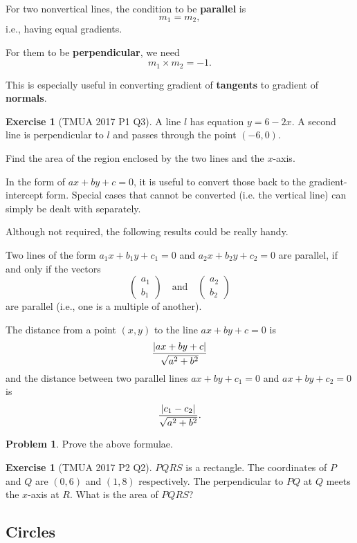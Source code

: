 \documentclass[11pt]{article}
\theoremstyle{definition}
\newtheorem{example}[theorem]{Exercise}
\newtheorem{problem}[theorem]{Problem}
\theoremstyle{remark}
\newcommand{\pqty}[1]{\left(#1\right)}
\DeclarePairedDelimiter{\abs}{\lvert}{\rvert}
\newcommand{\pmqty}[1]{\begin{pmatrix}#1\end{pmatrix}}
\newcommand{\qand}{\quad\text{and}\quad}
\begin{document}
For two nonvertical lines, the condition to be \textbf{parallel} is
\[
    m_1 = m_2,
\]
i.e., having equal gradients.

For them to be \textbf{perpendicular}, we need
\[
    m_1 \times m_2 = -1.
\]

This is especially useful in converting gradient of \textbf{tangents} to gradient of \textbf{normals}.

\begin{example}[TMUA 2017 P1 Q3]\label{tmua-3-unit-010}
    A line \(l\) has equation \(y = 6 - 2x\). A second line is perpendicular to \(l\) and passes through the point \(\pqty{-6, 0}\).

    Find the area of the region enclosed by the two lines and the \(x\)-axis.
\end{example}

In the form of \(ax + by + c = 0\), it is useful to convert those back to the gradient-intercept form. Special cases that cannot be converted (i.e. the vertical line) can simply be dealt with separately.

Although not required, the following results could be really handy.

Two lines of the form \(a_1 x + b_1 y + c_1 = 0\) and \(a_2 x + b_2 y + c_2 = 0\) are parallel, if and only if the vectors
\[
    \pmqty{a_1 \\ b_1} \qand \pmqty{a_2 \\ b_2}
\]
are parallel (i.e., one is a multiple of another).

The distance from a point \(\pqty{x, y}\) to the line \(ax + by + c = 0\) is
\[
    \frac{\abs{a x + b y + c}}{\sqrt{a^2 + b^2}}
\]
and the distance between two parallel lines \(ax + by + c_1 = 0\) and \(ax + by + c_2 = 0\) is
\[
    \frac{\abs{c_1 - c_2}}{\sqrt{a^2 + b^2}}.
\]

\begin{problem}\label{tmua-3-unit-011}
    Prove the above formulae.
\end{problem}

\begin{example}[TMUA 2017 P2 Q2]\label{tmua-3-unit-012}
    \(PQRS\) is a rectangle. The coordinates of \(P\) and \(Q\) are \(\pqty{0, 6}\) and \(\pqty{1, 8}\) respectively. The perpendicular to \(PQ\) at \(Q\) meets the \(x\)-axis at \(R\). What is the area of \(PQRS\)?
\end{example}

\subsection{Circles}\label{tmua-3-subsection-009}
\end{document}
